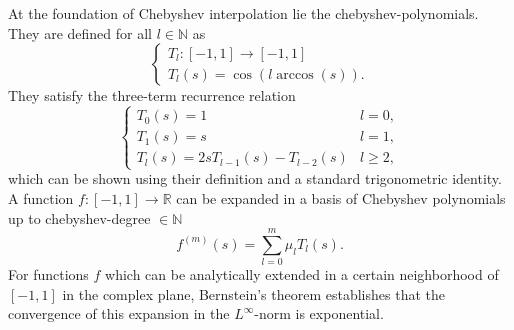 At the foundation of Chebyshev interpolation lie the \glspl{chebyshev-polynomial}.
They are defined for all $l \in \mathbb{N}$ as \cite[chapter~3]{trefethen2019chebyshev}
\begin{equation}
    \begin{cases}
        T_l: [-1, 1] \to [-1, 1] \\
        T_l(s) = \cos(l \arccos(s)).
    \end{cases}
    \label{equ:2-chebyshev-chebyshev-definition}
\end{equation}
They satisfy the three-term recurrence relation
\begin{equation}
    \begin{cases}
        T_0(s) = 1 & l = 0, \\
        T_1(s) = s & l = 1, \\
        T_{l}(s) = 2s T_{l-1}(s) - T_{l-2}(s) & l \geq 2,
    \end{cases}
    \label{equ:2-chebyshev-chebyshev-recursion}
\end{equation}
which can be shown using their definition 
and a standard trigonometric identity.\\

A function $f:[-1, 1] \to \mathbb{R}$ can be expanded in a basis of Chebyshev
polynomials up to \gls{chebyshev-degree} $\in \mathbb{N}$ \cite[chapter~3]{trefethen2019chebyshev}
\begin{equation}
    f^{(m)}(s) = \sum_{l=0}^{m} \mu_l T_l(s).
    \label{equ:2-chebyshev-chebyshev-expansion-general}
\end{equation}
For functions $f$ which can be analytically extended in a certain neighborhood
of $[-1, 1]$ in the complex plane, Bernstein's theorem \cite[theorem~4.3]{trefethen2008gauss}
establishes that the convergence of this expansion in the $L^{\infty}$-norm is
exponential.\\

